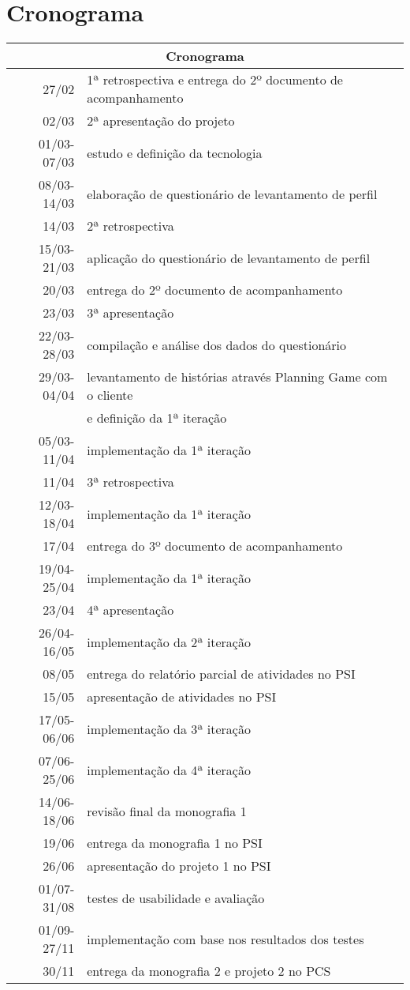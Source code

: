 \documentclass[a4paper,12pt,font=plain,header=plain]{abnt}
\begin{document}
  \section{Cronograma}

	\begin{tabular}[|l|]{ |r|l| }
	\hline
		\multicolumn{2}{|c|}{\textbf{Cronograma}} \\
	\hline
		27/02 & 1ª retrospectiva e entrega do 2º documento de acompanhamento \\
	\hline
		02/03 & 2ª apresentação do projeto \\
	\hline
		01/03-07/03 & estudo e definição da tecnologia \\
	\hline
		08/03-14/03 & elaboração de questionário de levantamento de perfil \\
	\hline
		14/03 & 2ª retrospectiva \\
	\hline
		15/03-21/03 & aplicação do questionário de levantamento de perfil \\
	\hline
		20/03 & entrega do 2º documento de acompanhamento \\
	\hline
		23/03 & 3ª apresentação \\
	\hline
		22/03-28/03 & compilação e análise dos dados do questionário \\
	\hline
		29/03-04/04 & levantamento de histórias através Planning Game com o cliente \\
			    & e definição da 1ª iteração \\
	\hline
		05/03-11/04 & implementação da 1ª iteração \\
	\hline
		11/04 & 3ª retrospectiva \\
	\hline
		12/03-18/04 & implementação da 1ª iteração \\
	\hline
		17/04 & entrega do 3º documento de acompanhamento \\
	\hline
		19/04-25/04 & implementação da 1ª iteração \\
	\hline
		23/04 & 4ª apresentação \\
	\hline
		26/04-16/05 & implementação da 2ª iteração \\
	\hline
		08/05 & entrega do relatório parcial de atividades no PSI \\
	\hline
		15/05 & apresentação de atividades no PSI \\
	\hline
		17/05-06/06 & implementação da 3ª iteração \\
	\hline
		07/06-25/06 & implementação da 4ª iteração \\
	\hline
		14/06-18/06 & revisão final da monografia 1 \\
	\hline
		19/06 & entrega da monografia 1 no PSI \\
	\hline
		26/06 & apresentação do projeto 1 no PSI \\
	\hline
		01/07-31/08 & testes de usabilidade e avaliação \\
	\hline
		01/09-27/11 & implementação com base nos resultados dos testes \\
	\hline
		30/11 & entrega da monografia 2 e projeto 2 no PCS \\
	\hline
	\end{tabular} \\

  
\end{document}
